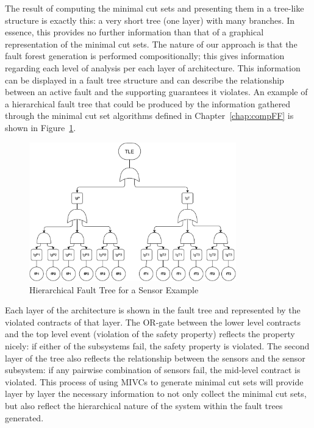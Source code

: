 The result of computing the minimal cut sets and presenting them in a tree-like structure is exactly this: a very short tree (one layer) with many branches. In essence, this provides no further information than that of a graphical representation of the minimal cut sets. The nature of our approach is that the fault forest generation is performed compositionally; this gives information regarding each level of analysis per each layer of architecture. This information can be displayed in a fault tree structure and can describe the relationship between an active fault and the supporting guarantees it violates. An example of a hierarchical fault tree that could be produced by the information gathered through the minimal cut set algorithms defined in Chapter~\ref{chap:compFF} is shown in Figure~\ref{fig:ftSensor}. 

\begin{figure}[h!]
	\centering
	\includegraphics[trim=0 0 0 0,clip,width=0.8\textwidth]{images/ftSensor.pdf}
	\caption{Hierarchical Fault Tree for a Sensor Example}
	\label{fig:ftSensor}
\end{figure}

Each layer of the architecture is shown in the fault tree and represented by the violated contracts of that layer. The OR-gate between the lower level contracts and the top level event (violation of the safety property) reflects the property nicely: if either of the subsystems fail, the safety property is violated. The second layer of the tree also reflects the relationship between the sensors and the sensor subsystem: if any pairwise combination of sensors fail, the mid-level contract is violated. This process of using MIVCs to generate minimal cut sets will provide layer by layer the necessary information to not only collect the minimal cut sets, but also reflect the hierarchical nature of the system within the fault trees generated.

